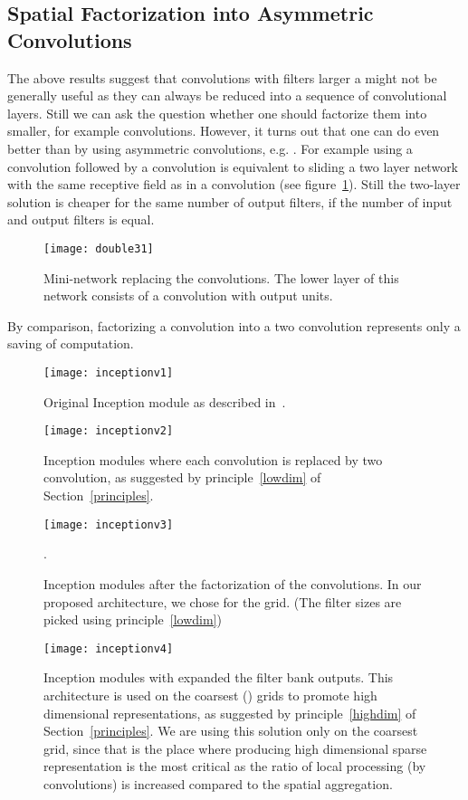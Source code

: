 \documentclass[10pt,twocolumn,letterpaper]{article}
\begin{document}
\subsection{Spatial Factorization into Asymmetric Convolutions}
The above results suggest that convolutions with filters larger
  a might
not be generally useful as they can always be reduced into a sequence of
 convolutional layers.
Still we can ask the question whether one should factorize them into smaller,
for example  convolutions.
However, it turns out that one can do even better than 
by using asymmetric convolutions, e.g. .
For example using a  convolution followed by a 
convolution is equivalent to sliding a two layer network with the same
receptive field as in a  convolution (see figure~\ref{fig:double31}).
Still the two-layer solution is  cheaper for the same number of
output filters, if the number of input and output filters is equal.
\begin{figure}
\centering
\texttt{[image: double31]}
\caption{Mini-network replacing the  convolutions.
  The lower layer of this network consists of a  convolution with
   output units.}
\label{fig:double31}
\end{figure}
By comparison, factorizing a 
convolution into a two  convolution represents only a  saving
of computation.
\begin{figure}
\centering
\texttt{[image: inceptionv1]}
\caption{Original Inception module as described in~\cite{szegedy2015going}.}
\label{fig:inceptionv1}
\end{figure}
\begin{figure}
\centering
\texttt{[image: inceptionv2]}
\caption{Inception modules where each  convolution is replaced by
  two  convolution, as suggested by principle~\ref{lowdim} of Section~\ref{principles}.}
\label{fig:inceptionv2}
\end{figure}
\begin{figure}
\centering
\texttt{[image: inceptionv3]}
\caption{Inception modules after the factorization of the 
convolutions. In our proposed architecture, we chose  for the
 grid. (The filter sizes are picked using principle~\ref{lowdim})}.
\label{fig:inceptionv3}
\end{figure}
\begin{figure}
\centering
\texttt{[image: inceptionv4]}
\caption{Inception modules with expanded the filter bank outputs. This
  architecture is used on the coarsest () grids to promote
high dimensional representations, as suggested by principle~\ref{highdim} of Section~\ref{principles}.
We are using this solution only on the coarsest grid, since that is the place
where producing high dimensional sparse representation is the most critical
as the ratio of local processing (by  convolutions) is increased
compared to the spatial aggregation.}
\label{fig:inceptionv4}
\end{figure}
\end{document}
